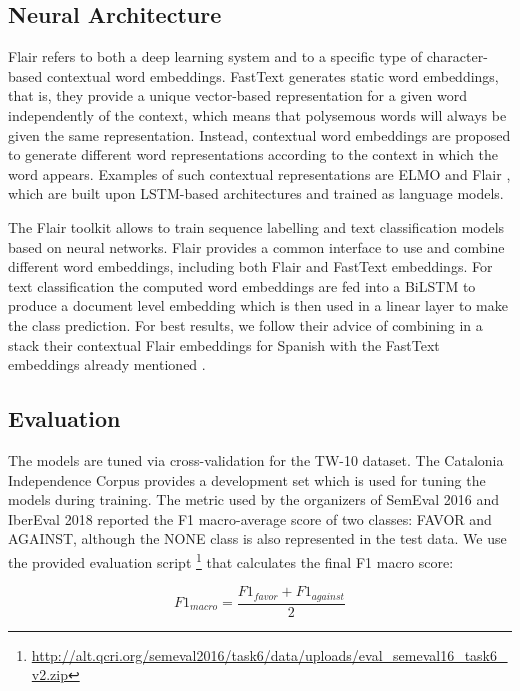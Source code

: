 \documentclass[10pt, a4paper]{article}
\begin{document}
\subsection{Neural Architecture}\label{sec:neural-architecture}

Flair refers to both a deep learning system and to a specific type of character-based contextual word embeddings. FastText generates static word embeddings, that is, they provide a unique vector-based representation for a given word independently of the context, which means that polysemous words will always be given the same representation. Instead, contextual word embeddings are proposed to generate different word representations according to the context in which the word appears. Examples of such contextual representations are ELMO \cite{Peters:2018} and Flair \cite{akbik-etal-2018-contextual}, which are built upon LSTM-based architectures and trained as language models.

The Flair toolkit \cite{akbik-etal-2019-flair} allows to train sequence labelling and text classification models based on neural networks. Flair provides a common interface to use and combine different word embeddings, including both Flair and FastText embeddings. For text classification the computed word embeddings are fed into a BiLSTM to produce a document level embedding which is then used in a linear layer to make the class prediction. For best results, we follow their advice of combining in a stack their contextual Flair embeddings for Spanish with the FastText embeddings already mentioned \cite{akbik-etal-2018-contextual}.

\subsection{Evaluation}\label{sec:evaluation}

The models are tuned via cross-validation for the TW-10 dataset. The Catalonia Independence Corpus provides a development set which is used for tuning the models during training. The metric used by the organizers of SemEval 2016 \cite{mohammad-etal-2016-semeval} and IberEval 2018 \cite{taule18} reported the F1 macro-average score of two classes: FAVOR and AGAINST, although the NONE class is also represented in the test data. We use the provided evaluation script \footnote{\url{http://alt.qcri.org/semeval2016/task6/data/uploads/eval_semeval16_task6_v2.zip}} that calculates the final F1 macro score:

\[F1_{macro} = \frac{F1_{favor} + F1_{against}}{2}\]
\end{document}
